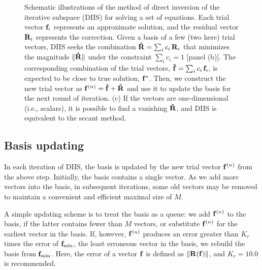 \documentclass[reprint,aip,jcp,superscriptaddress]{revtex4-1}
\begin{document}
\begin{figure}
  \caption{\label{fig:scheme}
    Schematic illustrations of the method of
    direct inversion of the iterative subspace (DIIS)
    for solving a set of equations.
    Each trial vector $\mathbf{f}_i$
    represents an approximate solution,
    and the residual vector $\mathbf{R}_i$
    represents the correction.
    Given a basis of a few (two here) trial vectors,
    DIIS seeks the combination
    $\mathbf{\hat R} = \sum_i c_i \, \mathbf{R}_i$
    that minimizes the magnitude
    $\| \mathbf{\hat R} \|$
    under the constraint
    $\sum_i c_i = 1$ [panel (b)].
    The corresponding combination
    of the trial vectors,
    $\mathbf{\hat f} = \sum_i c_i \, \mathbf{f}_i$,
    is expected to be close to true solution, $\mathbf{f}^*$.
    Then,
    we construct
    the new trial vector as
    $\mathbf{f}^{(n)} = \mathbf{\hat f} + \mathbf{\hat R}$
    and use it to update the basis
    for the next round of iteration.
    (c) If the vectors are one-dimensional (i.e., scalars),
    it is possible to find a vanishing $\mathbf{\hat R}$, and
    DIIS is equivalent to the secant method.
  }
\end{figure}




\subsection{\label{sec:basis_updating}Basis updating}



In each iteration of DIIS,
the basis is updated
by the new trial vector $\mathbf{f}^{(n)}$
from the above step.
%
Initially,
the basis contains a single vector.
%
As we add more vectors into the basis, in subsequent iterations,
some old vectors may be removed
to maintain a convenient and efficient maximal size of $M$.



A simple updating scheme\cite{kovalenko1999}
is to treat the basis as a queue:
%
we add $\mathbf{f}^{(n)}$ to the basis,
if the latter contains fewer than $M$ vectors,
%
or substitute $\mathbf{f}^{(n)}$ for the earliest vector in the basis.
%
If, however, $\mathbf{f}^{(n)}$
produces an error greater than
$K_r$ times the error of
$\mathbf{f}_\mathrm{min}$,
the least erroneous vector in the basis,
%
we rebuild the basis
from $\mathbf{f}_\mathrm{min}$.
%
Here, the error of a vector $\mathbf{f}$ is defined as
$\| \mathbf{R}(\mathbf{f}) \|$,
and
$K_r = 10.0$ is recommended\cite{
kovalenko1999}.
\end{document}
